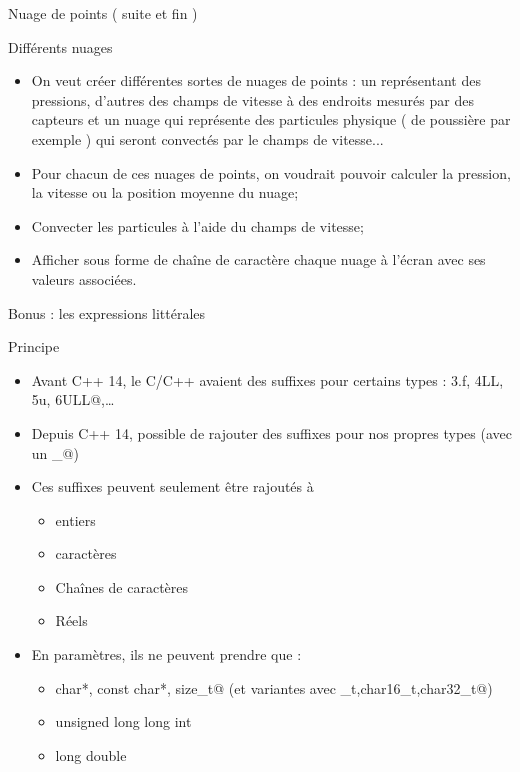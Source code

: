 \documentclass[handout,10pt]{beamer}
\begin{document}
\begin{frame}{Nuage de points ( suite et fin )}
 \begin{exampleblock}{Différents nuages}
  \begin{itemize}
   \item On veut créer différentes sortes de nuages de points : un représentant des pressions, d'autres des champs de vitesse à des endroits mesurés par des capteurs et un nuage qui représente des particules physique ( de poussière par exemple ) qui seront convectés par le champs de vitesse...
   \item Pour chacun de ces nuages de points, on voudrait pouvoir calculer la pression, la vitesse ou la position moyenne du nuage;
   \item Convecter les particules à l'aide du champs de vitesse;
   \item Afficher sous forme de chaîne de caractère chaque nuage à l'écran avec ses valeurs associées.
  \end{itemize}
 \end{exampleblock}
\end{frame}

\begin{frame}[fragile]{Bonus : les expressions littérales}

\begin{block}{Principe}
\begin{itemize}
  \item Avant C++ 14, le C/C++ avaient des suffixes pour certains types :
  \verb@3.f, 4LL, 5u, 6ULL@,\ldots
  \item Depuis C++ 14, possible de rajouter des suffixes pour nos propres types (avec un \verb@_@)
  \item Ces suffixes peuvent seulement être rajoutés à
  \begin{itemize}
    \item entiers
    \item caractères
    \item Chaînes de caractères
    \item Réels
  \end{itemize}
  \item En paramètres, ils ne peuvent prendre que :
  \begin{itemize}
    \item \verb@const char*, {const char*, size_t}@ (et variantes avec _t,char16_t,char32_t@)
    \item unsigned long long int
    \item long double
  \end{itemize}
\end{itemize}
\end{block}

\end{frame}
\end{document}
